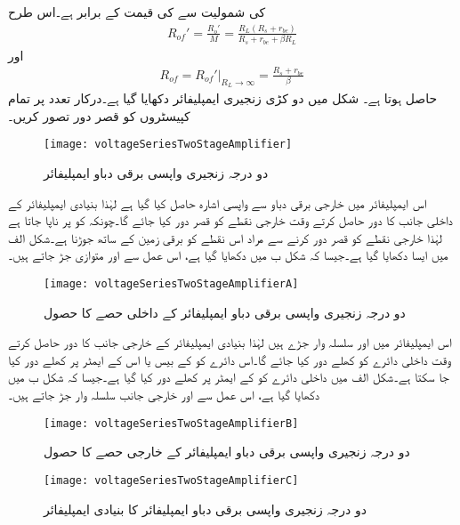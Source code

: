  کی شمولیت سے  کی قیمت  کے برابر ہے۔اس طرح
\begin{align}
R_{of}'=\frac{R_o'}{M}=\frac{R_L(R_s+r_{be})}{R_s+r_{be}+\beta R_L}
\end{align}
اور
\begin{align}
R_{of}=\left. R_{of}'\right|_{R_L \to \infty} =\frac{R_s+r_{be}}{\beta}
\end{align}
حاصل ہوتا ہے۔
%
شکل  میں دو کڑی زنجیری ایمپلیفائر دکھایا گیا  ہے۔درکار تعدد پر تمام کپیسٹروں کو قصر دور تصور کریں۔
\begin{figure}
\centering
\texttt{[image: voltageSeriesTwoStageAmplifier]}
\caption{دو درجہ زنجیری واپسی برقی دباو ایمپلیفائر}
\label{شکل_واپسی_دو_درجہ_واپسی_برقی_دباو_ایمپلیفائر}
\end{figure}
اس ایمپلیفائر میں خارجی برقی دباو  سے واپسی اشارہ  حاصل کیا گیا ہے لہٰذا بنیادی ایمپلیفائر کے داخلی جانب کا دور حاصل کرتے وقت خارجی نقطے  کو قصر دور کیا جائے گا۔چونکہ  کو   پر ناپا جاتا ہے لہٰذا خارجی نقطے  کو قصر دور کرنے سے مراد اس نقطے  کو برقی زمین کے ساتھ جوڑنا ہے۔شکل  الف میں ایسا دکھایا گیا ہے۔جیسا کہ شکل  ب میں دکھایا گیا ہے، اس عمل سے  اور  متوازی جڑ جاتے ہیں۔
\begin{figure}
\centering
\texttt{[image: voltageSeriesTwoStageAmplifierA]}
\caption{دو درجہ زنجیری واپسی برقی دباو ایمپلیفائر کے داخلی حصے کا حصول}
\label{شکل_واپسی_دو_درجہ_واپسی_برقی_دباو_ایمپلیفائر_داخلی_حصہ}
\end{figure}
اس ایمپلیفائر میں  اور  سلسلہ وار جڑے ہیں لہٰذا بنیادی ایمپلیفائر کے خارجی جانب کا دور حاصل کرتے وقت داخلی دائرے کو کھلے دور کیا جائے گا۔اس دائرے کو  کے بیس یا اس کے ایمٹر پر کھلے دور کیا جا سکتا ہے۔شکل  الف  میں داخلی دائرے کو  کے ایمٹر پر کھلے دور کیا گیا ہے۔جیسا کہ شکل  ب میں دکھایا گیا ہے، اس عمل سے  اور  خارجی جانب سلسلہ وار جڑ جاتے ہیں۔
\begin{figure}
\centering
\texttt{[image: voltageSeriesTwoStageAmplifierB]}
\caption{دو درجہ زنجیری واپسی برقی دباو ایمپلیفائر کے خارجی حصے کا حصول}
\label{شکل_واپسی_دو_درجہ_واپسی_برقی_دباو_ایمپلیفائر_خارجی_حصہ}
\end{figure}
%
\begin{figure}
\centering
\texttt{[image: voltageSeriesTwoStageAmplifierC]}
\caption{دو درجہ زنجیری واپسی برقی دباو ایمپلیفائر کا بنیادی ایمپلیفائر}
\label{شکل_واپسی_دو_درجہ_واپسی_برقی_دباو_ایمپلیفائر_بنیادی}
\end{figure}
